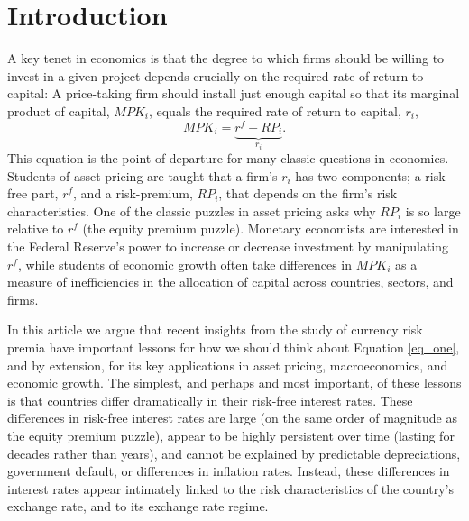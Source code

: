 \section{Introduction}


A key tenet in economics is that the degree to which firms should be
willing to invest in a given project depends crucially on the required
rate of return to capital: A price-taking firm should install just
enough capital so that its marginal product of capital, $MPK_i$,
equals the required rate of return to capital, $r_i$,
\begin{equation}
  MPK_i=\underbrace{r^f+RP_i}_{r_i}.
  \label{eq_one}
\end{equation} 
This equation is the point of departure for many classic questions in
economics. Students of asset pricing are taught that a firm's $r_i$
has two components; a risk-free part, $r^f$, and a risk-premium,
$RP_i$, that depends on the firm's risk characteristics. One of the
classic puzzles in asset pricing asks why $RP_i$ is so large relative to
$r^f$ (the equity premium puzzle). Monetary economists are interested
in the Federal Reserve's power to increase or decrease investment by
manipulating $r^f$, while students of economic growth often take
differences in $MPK_i$ as a measure of inefficiencies in the
allocation of capital across countries, sectors, and firms.

In this article we argue that recent insights from the study of
currency risk premia have important lessons for how we should think
about Equation \eqref{eq_one}, and by extension, for its key
applications in asset pricing, macroeconomics, and economic growth.
The simplest, and perhaps and most important, of these lessons is that
countries differ dramatically in their risk-free interest rates. These
differences in risk-free interest rates are large (on the same order
of magnitude as the equity premium puzzle), appear to be highly
persistent over time (lasting for decades rather than years), and
cannot be explained by predictable depreciations, government default,
or differences in inflation rates. Instead, these differences in
interest rates appear intimately linked to the risk characteristics of
the country's exchange rate, and to its exchange rate regime.

